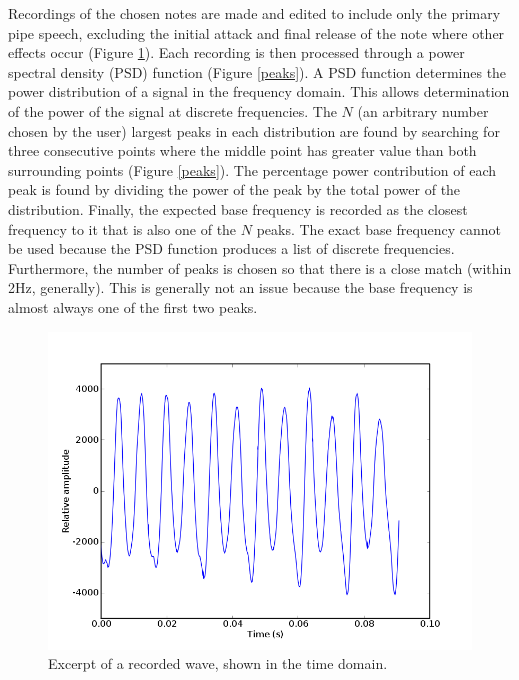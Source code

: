 \documentclass[twocolumn]{article}
\begin{document}
Recordings of the chosen notes are made and edited to include only the primary pipe speech, excluding the initial attack and final release of the note where other effects occur (Figure \ref{time}). Each recording is then processed through a power spectral density (PSD) function (Figure \ref{peaks}). A PSD function determines the power distribution of a signal in the frequency domain. This allows determination of the power of the signal at discrete frequencies. The $N$ (an arbitrary number chosen by the user) largest peaks in each distribution are found by searching for three consecutive points where the middle point has greater value than both surrounding points (Figure \ref{peaks}). The percentage power contribution of each peak is found by dividing the power of the peak by the total power of the distribution. Finally, the expected base frequency is recorded as the closest frequency to it that is also one of the $N$ peaks. The exact base frequency cannot be used because the PSD function produces a list of discrete frequencies. Furthermore, the number of peaks is chosen so that there is a close match (within 2Hz, generally). This is generally not an issue because the base frequency is almost always one of the first two peaks.

\begin{figure}
\centering
\includegraphics[width=\linewidth]{figures/recording-time.png}
\caption{Excerpt of a recorded wave, shown in the time domain.}
\label{time}
\end{figure}
\end{document}

